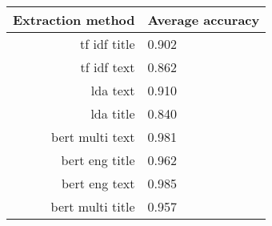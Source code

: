 \begin{tabular}{|r|l|}
  \hline
  Extraction method & Average accuracy \\ 
  \hline
  tf idf title & 0.902 \\ 
  \hline
  tf idf text & 0.862 \\ 
  \hline
  lda text & 0.910 \\ 
  \hline
  lda title & 0.840 \\ 
  \hline
  bert multi text & 0.981 \\ 
  \hline
  bert eng title & 0.962 \\ 
  \hline
  bert eng text & 0.985 \\ 
  \hline
  bert multi title & 0.957 \\ 
  \hline
\end{tabular}
